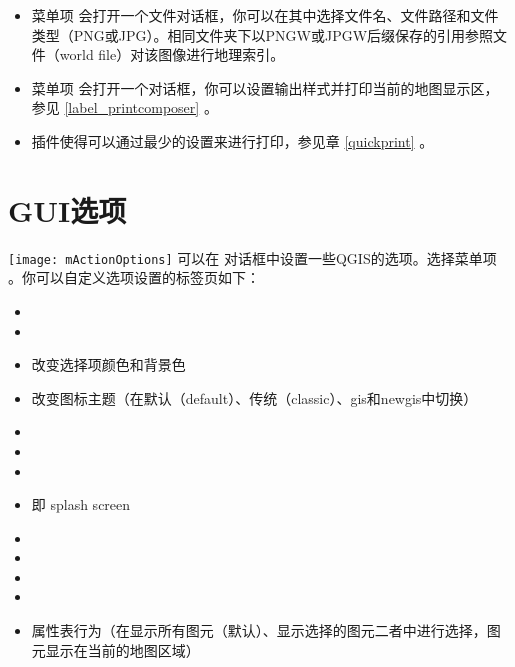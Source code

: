 \begin{itemize}
\item 菜单项  会打开一个文件对话框，你可以在其中选择文件名、文件路径和文件类型（PNG或JPG）。相同文件夹下以PNGW或JPGW后缀保存的引用参照文件（world file）对该图像进行地理索引。
\item 菜单项  会打开一个对话框，你可以设置输出样式并打印当前的地图显示区，参见 \ref{label_printcomposer} 。
\item {} 插件使得可以通过最少的设置来进行打印，参见章 \ref{quickprint} 。
\end{itemize}

\section{GUI选项}\label{subsec:gui_options}

\texttt{[image: mActionOptions]} 可以在  对话框中设置一些QGIS的选项。选择菜单项  \arrow
{} 。你可以自定义选项设置的标签页如下：


\begin{itemize}
\item {}
\item {}
\item 改变选择项颜色和背景色
\item 改变图标主题（在默认（default）、传统（classic）、gis和newgis中切换）
\item {}
\item {}
\item {}
\item {} 即 splash screen
\item {}
\item {}
\item {}
\item {}
\item 属性表行为（在显示所有图元（默认）、显示选择的图元二者中进行选择，图元显示在当前的地图区域）
\end{itemize}

